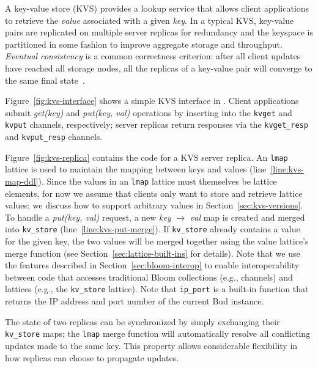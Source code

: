 A key-value store (KVS) provides a lookup service that allows client
applications to retrieve the \emph{value} associated with a given \emph{key}. In
a typical KVS, key-value pairs are replicated on multiple server replicas for
redundancy and the keyspace is partitioned in some fashion to improve aggregate
storage and throughput. \emph{Eventual consistency} is a common correctness
criterion: after all client updates have reached all storage nodes, all the
replicas of a key-value pair will converge to the same final
state~\cite{Terry1995,vogels}.

Figure~\ref{fig:kvs-interface} shows a simple KVS interface in \lang. Client
applications submit \emph{get(key)} and \emph{put(key, val)} operations by
inserting into the \texttt{kvget} and \texttt{kvput} channels, respectively;
server replicas return responses via the \texttt{kvget\_resp} and
\texttt{kvput\_resp} channels.

Figure~\ref{fig:kvs-replica} contains the \lang code for a KVS server
replica. An \texttt{lmap} lattice is used to maintain the mapping between keys
and values (line~\ref{line:kvs-map-ddl}). Since the values in an \texttt{lmap}
lattice must themselves be lattice elements, for now we assume that clients only
want to store and retrieve lattice values; we discuss how to support arbitrary
values in Section~\ref{sec:kvs-versions}. To handle a \emph{put(key, val)}
request, a new \emph{key} $\to$ \emph{val} map is created and merged into
\texttt{kv\_store} (line~\ref{line:kvs-put-merge}). If \texttt{kv\_store}
already contains a value for the given key, the two values will be merged
together using the value lattice's merge function (see
Section~\ref{sec:lattice-built-ins} for details). Note that we use the \lang
features described in Section~\ref{sec:bloom-interop} to enable interoperability
between code that accesses traditional Bloom collections (e.g., channels) and
lattices (e.g., the \texttt{kv\_store} lattice).  Note that \texttt{ip\_port} is
a built-in function that returns the IP address and port number of the current
Bud instance.

The state of two replicas can be synchronized by simply exchanging their
\texttt{kv\_store} maps; the \texttt{lmap} merge function will automatically
resolve all conflicting updates made to the same key. This property allows
considerable flexibility in how replicas can choose to propagate updates.

